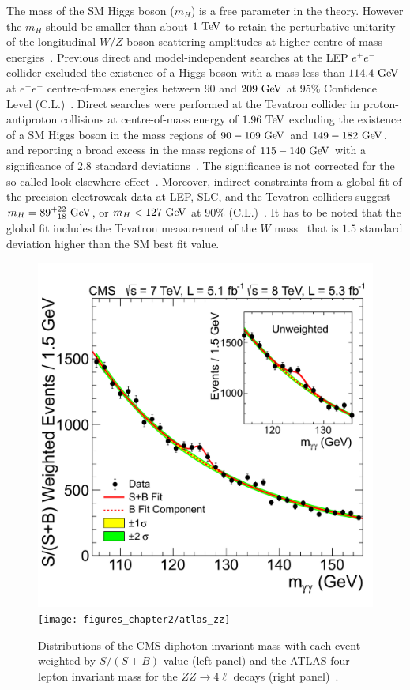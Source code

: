 The mass of the SM Higgs boson ($m_{H}$) is a free parameter in the theory. However the $m_{H}$ should be smaller than about $1~\mathrm{Te\kern -0.1em V}$ to retain the perturbative unitarity of the longitudinal $W/Z$ boson scattering amplitudes at higher centre-of-mass energies~\cite{Cornwall:1973tb,Cornwall:1974km,LlewellynSmith:1973yud,Lee:1977eg}.  Previous direct and model-independent searches at the LEP $e^{+}e^{-}$ collider excluded the existence of a Higgs boson with a mass less than $114.4~\mathrm{Ge\kern -0.1em V}$ at $e^+e^-$ centre-of-mass energies between $90$ and $209~\mathrm{Ge\kern -0.1em V}$ at $95\%$ Confidence Level (C.L.)~\cite{Barate:2003sz}. Direct searches were performed at the Tevatron collider in proton-antiproton collisions at centre-of-mass energy of $1.96~\mathrm{Te\kern -0.1em V}$ excluding the existence of a SM Higgs boson in the mass regions of $90-109~\mathrm{Ge\kern -0.1em V}$ and $149-182~\mathrm{Ge\kern -0.1em V}$, and reporting a broad excess in the mass regions of $115-140~\mathrm{Ge\kern -0.1em V}$ with a significance of $2.8$ standard deviations~\cite{Aaltonen:2013ioz}. The significance is not corrected for the so called look-elsewhere effect~\cite{loook}. Moreover, indirect constraints from a global fit of the precision electroweak data at LEP, SLC, and the Tevatron colliders suggest $m_{H}=89^{+22}_{-18}~\mathrm{Ge\kern -0.1em V}$, or $m_{H}<127~\mathrm{Ge\kern -0.1em V}$ at $90\%$ (C.L.)~\cite{Agashe:2014kda}. It has to be noted that the global fit includes the Tevatron measurement of the $W$ mass~\cite{Aaltonen:2013iut} that is $1.5$ standard deviation higher than the SM best fit value. 

\begin{figure}[h]
\centering
\includegraphics[width=0.49\columnwidth]{figures_chapter2/gammagamma}
\texttt{[image: figures\_chapter2/atlas\_zz]}
\caption{Distributions of the CMS diphoton invariant mass with each event weighted by $S/(S+B)$ value (left panel) and the ATLAS four-lepton invariant mass for the $ZZ \rightarrow 4 \ell$ decays (right panel)~\cite{Chatrchyan:2012xdj}.}
\label{fig:cms_higgs}
\end{figure}

